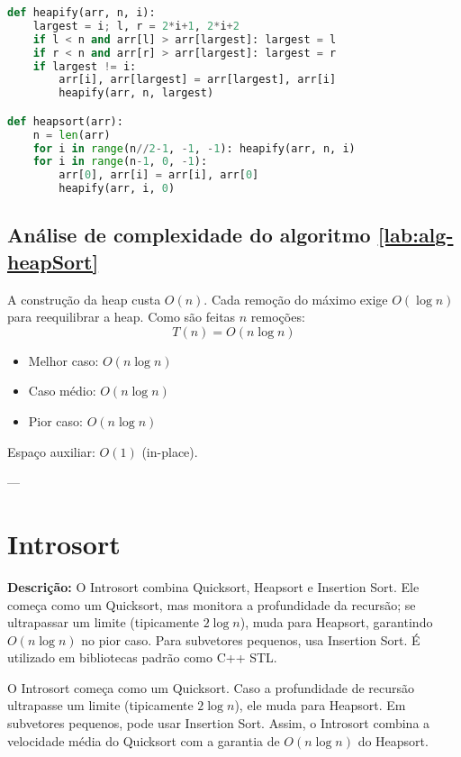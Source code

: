 \begin{lstlisting}[language=Python, caption={Heapsort em Python}, label=code:heapSortPy]
def heapify(arr, n, i):
    largest = i; l, r = 2*i+1, 2*i+2
    if l < n and arr[l] > arr[largest]: largest = l
    if r < n and arr[r] > arr[largest]: largest = r
    if largest != i:
        arr[i], arr[largest] = arr[largest], arr[i]
        heapify(arr, n, largest)

def heapsort(arr):
    n = len(arr)
    for i in range(n//2-1, -1, -1): heapify(arr, n, i)
    for i in range(n-1, 0, -1):
        arr[0], arr[i] = arr[i], arr[0]
        heapify(arr, i, 0)
\end{lstlisting}

\subsection{Análise de complexidade do algoritmo \ref{lab:alg-heapSort}}
A construção da heap custa $O(n)$. Cada remoção do máximo exige $O(\log n)$ para reequilibrar a heap. Como são feitas $n$ remoções:
\[
T(n) = O(n \log n)
\]
\begin{itemize}
    \item Melhor caso: $O(n \log n)$
    \item Caso médio: $O(n \log n)$
    \item Pior caso: $O(n \log n)$
\end{itemize}
Espaço auxiliar: $O(1)$ (in-place).

---


\section{Introsort}

\textbf{Descrição:} O Introsort combina Quicksort, Heapsort e Insertion Sort. Ele começa como um Quicksort, mas monitora a profundidade da recursão; se ultrapassar um limite (tipicamente $2 \log n$), muda para Heapsort, garantindo $O(n \log n)$ no pior caso. Para subvetores pequenos, usa Insertion Sort. É utilizado em bibliotecas padrão como C++ STL.

\begin{exmp}
O Introsort começa como um Quicksort. Caso a profundidade de recursão ultrapasse um limite (tipicamente $2\log n$), ele muda para Heapsort. Em subvetores pequenos, pode usar Insertion Sort. Assim, o Introsort combina a velocidade média do Quicksort com a garantia de $O(n \log n)$ do Heapsort.
\end{exmp}


